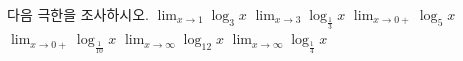 다음 극한을 조사하시오.
 $\displaystyle\lim_{x\to 1}\log_3 x$
 $\displaystyle\lim_{x\to 3}\log_{\frac{1}{3}}x$
 $\displaystyle\lim_{x\to 0+}\log_5 x$
 $\displaystyle\lim_{x\to 0+}\log_{\frac{1}{10}}x$
 $\displaystyle\lim_{x\to\infty}\log_{12}x$
 $\displaystyle\lim_{x\to\infty}\log_{\frac{1}{4}}x$
